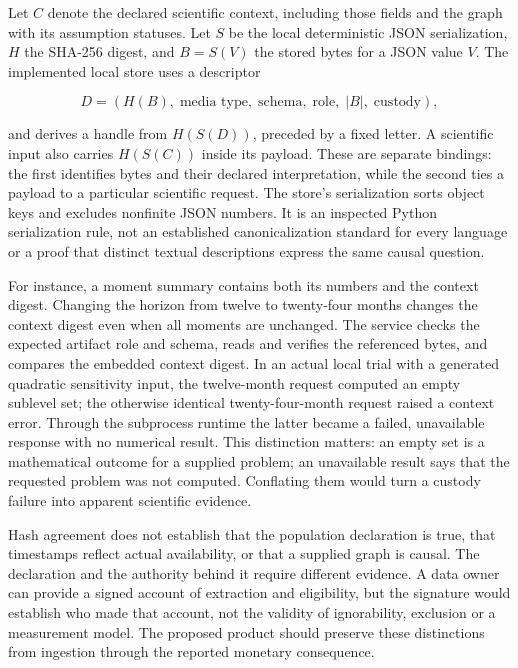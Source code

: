 Let \(C\) denote the declared scientific context, including those fields
and the graph with its assumption statuses. Let \(S\) be the local
deterministic JSON serialization, \(H\) the SHA-256 digest, and
\(B=S(V)\) the stored bytes for a JSON value \(V\). The implemented
local store uses a descriptor

\[
D=(H(B),\;\text{media type},\;\text{schema},\;\text{role},\;|B|,\;\text{custody}),
\]

and derives a handle from \(H(S(D))\), preceded by a fixed letter. A
scientific input also carries \(H(S(C))\) inside its payload. These are
separate bindings: the first identifies bytes and their declared
interpretation, while the second ties a payload to a particular
scientific request. The store's serialization sorts object keys and
excludes nonfinite JSON numbers. It is an inspected Python serialization
rule, not an established canonicalization standard for every language or
a proof that distinct textual descriptions express the same causal
question.~\citep{exec14_custody_implementation}

For instance, a moment summary contains both its numbers and the context
digest. Changing the horizon from twelve to twenty-four months changes
the context digest even when all moments are unchanged. The service
checks the expected artifact role and schema, reads and verifies the
referenced bytes, and compares the embedded context digest. In an actual
local trial with a generated quadratic sensitivity input, the
twelve-month request computed an empty sublevel set; the otherwise
identical twenty-four-month request raised a context error. Through the
subprocess runtime the latter became a failed, unavailable response with
no numerical result. This distinction matters: an empty set is a
mathematical outcome for a supplied problem; an unavailable result says
that the requested problem was not computed. Conflating them would turn
a custody failure into apparent scientific evidence.
\citep{exec14_custody_observations}

Hash agreement does not establish that the population declaration is
true, that timestamps reflect actual availability, or that a supplied
graph is causal. The declaration and the authority behind it require
different evidence. A data owner can provide a signed account of
extraction and eligibility, but the signature would establish who made
that account, not the validity of ignorability, exclusion or a
measurement model. The proposed product should preserve these
distinctions from ingestion through the reported monetary consequence.

